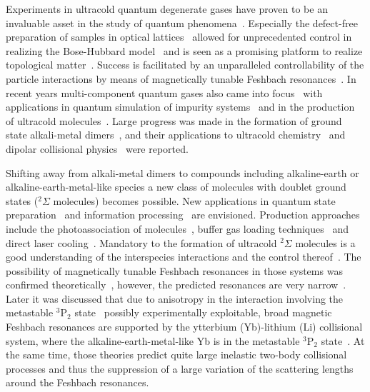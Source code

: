 \documentclass[twocolumn,superscriptaddress,showpacs,floatfix,amsmath,amssymb]{revtex4-1}
\newcommand{\triplet}{{}^3\mathrm{P}_2}
\begin{document}
Experiments in ultracold quantum degenerate gases have proven to be an
invaluable asset in the study of quantum phenomena~\cite{bloch_many-body_2008,
bloch_quantum_2012}. Especially the defect-free preparation of samples in
optical lattices~\cite{giorgini_theory_2008} allowed for unprecedented control
in realizing the Bose-Hubbard model~\cite{bloch_ultracold_2005} and is seen as
a promising platform to realize topological
matter~\cite{goldman_topological_2016}. Success is facilitated by an
unparalleled controllability of the particle interactions by means of
magnetically tunable Feshbach resonances~\cite{chin_feshbach_2010}. In recent
years multi-component quantum gases also came into
focus~\cite{myatt_production_1997} with applications in quantum simulation of
impurity systems~\cite{massignan_polarons_2014} and in the production of
ultracold molecules~\cite{carr_cold_2009, moses_new_2017}. Large progress was
made in the formation of ground state alkali-metal
dimers~\cite{jones_ultracold_2006}, and their applications to ultracold
chemistry~\cite{ospelkaus_quantum-state_2010} and dipolar collisional
physics~\cite{ni_dipolar_2010} were reported.

Shifting away from alkali-metal dimers to compounds including alkaline-earth
or alkaline-earth-metal-like species a new class of molecules with doublet
ground states ($^2\Sigma$ molecules) becomes possible. New applications in
quantum state preparation~\cite{perez-rios_external_2010} and information
processing~\cite{micheli_toolbox_2006} are envisioned. Production approaches
include the photoassociation of molecules~\cite{jones_ultracold_2006,
nemitz_production_2009}, buffer gas loading
techniques~\cite{weinstein_magnetic_1998, maussang_zeeman_2005} and direct
laser cooling~\cite{shuman_radiative_2009}. Mandatory to the formation of
ultracold $^2\Sigma$ molecules is a good understanding of the interspecies
interactions and the control thereof~\cite{krems_cold_2009}. The possibility
of magnetically tunable Feshbach resonances in those systems was confirmed
theoretically~\cite{zuchowski_ultracold_2010}, however, the predicted
resonances are very narrow~\cite{brue_magnetically_2012}. Later it was
discussed that due to anisotropy in the interaction involving the metastable
$\triplet$ state~\cite{reid_fine-structure_1969} possibly experimentally
exploitable, broad magnetic Feshbach resonances are supported by the ytterbium
(Yb)-lithium (Li) collisional system, where the alkaline-earth-metal-like Yb
is in the metastable $\triplet$
state~\cite{gonzalez-martinez_magnetically_2013, petrov_magnetic_2015,
chen_anisotropy_2015}. At the same time, those theories predict quite large
inelastic two-body collisional processes and thus the suppression of a large
variation of the scattering lengths around the Feshbach resonances.
\end{document}
